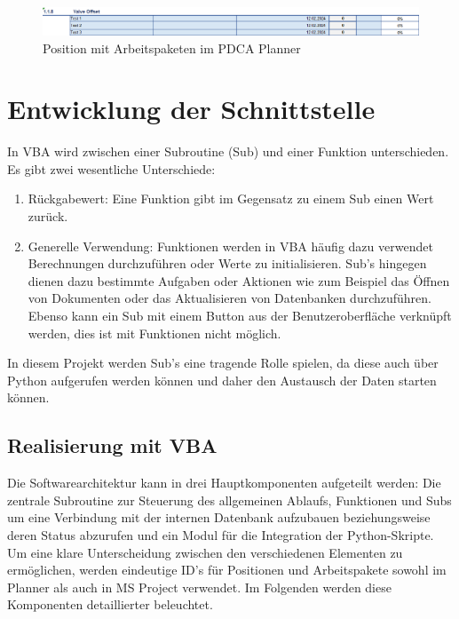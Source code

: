 \documentclass[11pt,a4paper]{report}
\begin{document}
\begin{figure}[H]
    \centering
    \includegraphics[width=\linewidth]{images/Excel_Position_Beispiel.png}
    \caption{Position mit Arbeitspaketen im PDCA Planner}
    \label{fig:PDCA_Example}
\end{figure}


\section{Entwicklung der Schnittstelle}
In VBA wird zwischen einer Subroutine (Sub) und einer Funktion unterschieden. Es gibt zwei wesentliche Unterschiede:
\begin{enumerate}
    \item Rückgabewert: Eine Funktion gibt im Gegensatz zu einem Sub einen Wert zurück.
    \item Generelle Verwendung: Funktionen werden in VBA häufig dazu verwendet Berechnungen durchzuführen oder Werte zu initialisieren. Sub's hingegen dienen dazu bestimmte Aufgaben oder Aktionen wie zum Beispiel das Öffnen von Dokumenten oder das Aktualisieren von Datenbanken durchzuführen. Ebenso kann ein Sub mit einem Button aus der Benutzeroberfläche verknüpft werden, dies ist mit Funktionen nicht möglich.
\end{enumerate}
In diesem Projekt werden Sub's eine tragende Rolle spielen, da diese auch über Python aufgerufen werden können und daher den Austausch der Daten starten können.


\subsection{Realisierung mit VBA}
Die Softwarearchitektur kann in drei Hauptkomponenten aufgeteilt werden: Die zentrale Subroutine zur Steuerung des allgemeinen Ablaufs, Funktionen und Subs um eine Verbindung mit der internen Datenbank aufzubauen beziehungsweise deren Status abzurufen und ein Modul für die Integration der Python-Skripte. Um eine klare Unterscheidung zwischen den verschiedenen Elementen zu ermöglichen, werden eindeutige ID's für Positionen und Arbeitspakete sowohl im Planner als auch in MS Project verwendet. Im Folgenden werden diese Komponenten detaillierter beleuchtet.
\end{document}
